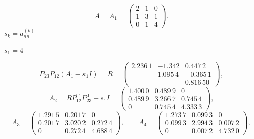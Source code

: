 \documentclass[UTF8,fontset=fandol]{ctexart}
\begin{document}
\[
A=A_1=\begin{pmatrix}2&1&0\\1&3&1\\0&1&4\end{pmatrix}.
\]
$s_k=a_{nn}^{(k)}$\par
$s_1=4$\par
\[
P_{23}P_{12}(A_1-s_1I)=R=\begin{pmatrix}
2.236\,1&-1.342&0.447\,2\\
&1.095\,4&-0.365\,1\\
&&0.816\,50
\end{pmatrix},
\]
\[
A_2=RP_{12}^{\mathrm T}P_{23}^{\mathrm T}+s_1I
=\begin{pmatrix}
1.400\,0&0.489\,9&0\\
0.489\,9&3.266\,7&0.745\,4\\
0&0.745\,4&4.333\,3
\end{pmatrix},
\]
\[
A_3=\begin{pmatrix}
1.291\,5&0.201\,7&0\\
0.201\,7&3.020\,2&0.272\,4\\
0&0.272\,4&4.688\,4
\end{pmatrix},\qquad
A_4=\begin{pmatrix}
1.273\,7&0.099\,3&0\\
0.099\,3&2.994\,3&0.007\,2\\
0&0.007\,2&4.732\,0
\end{pmatrix},
\]
\clearpage
\end{document}
